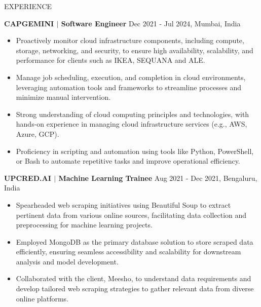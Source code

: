 \documentclass{resume} %
\begin{document}
\begin{rSection}{EXPERIENCE}

\textbf{CAPGEMINI $\vert$ Software Engineer} \hfill Dec 2021 - Jul 2024, Mumbai, India\\
\vspace{-\baselineskip} 
 \begin{itemize}
    \itemsep -3pt {} 
     \item Proactively monitor cloud infrastructure components, including compute, storage, networking, and security, to ensure high availability, scalability, and performance for clients such as IKEA, SEQUANA and ALE.
     \item Manage job scheduling, execution, and completion in cloud environments, leveraging automation tools and frameworks to streamline processes and minimize manual intervention.
    \item Strong understanding of cloud computing principles and technologies, with hands-on experience in managing cloud infrastructure services (e.g., AWS, Azure, GCP).
    \item Proficiency in scripting and automation using tools like Python, PowerShell, or Bash to automate repetitive tasks and improve operational efficiency.
 \end{itemize}
 
\textbf{UPCRED.AI $\vert$ Machine Learning Trainee} \hfill Aug 2021 - Dec 2021, Bengaluru, India\\
\vspace{-\baselineskip} 
 \begin{itemize}
    \itemsep -3pt {} 
     \item Spearheaded web scraping initiatives using Beautiful Soup to extract pertinent data from various online sources, facilitating data collection and preprocessing for machine learning projects.
     \item Employed MongoDB as the primary database solution to store scraped data efficiently, ensuring seamless accessibility and scalability for downstream analysis and model development.
    \item Collaborated with the client, Meesho, to understand data requirements and develop tailored web scraping strategies to gather relevant data from diverse online platforms.
 \end{itemize}

\end{rSection} 

\end{document}
